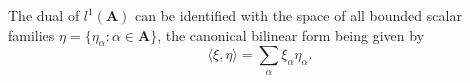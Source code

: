 The dual of $l^1(\mathbf{A})$ can be identified with the space of all bounded scalar families $\eta = \{\eta_\alpha : \alpha \in \mathbf{A}\}$, the canonical bilinear form being given by
$$\langle \xi, \eta \rangle = \sum_\alpha \xi_\alpha \eta_\alpha.$$
